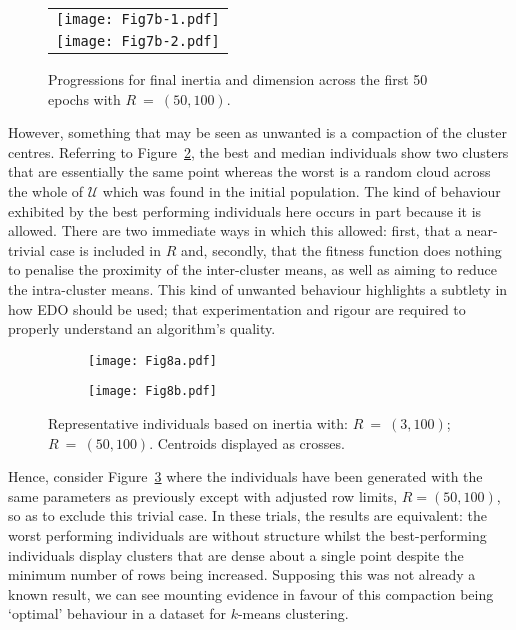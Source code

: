 \begin{figure}[htbp]
    \centering
    \begin{tabular}{c}
        \texttt{[image: Fig7b-1.pdf]}
        \\
        \texttt{[image: Fig7b-2.pdf]}
    \end{tabular}
    \caption{%
        Progressions for final inertia and dimension across the first 50 epochs
        with \(R~=~(50,100)\).
    }\label{fig:large-inertia-50}
\end{figure}

However, something that may be seen as unwanted is a compaction of the cluster
centres. Referring to Figure~\ref{fig:small-inertia-inds}, the best and median
individuals show two clusters that are essentially the same point whereas the
worst is a random cloud across the whole of \(\mathcal{U}\) which was found in
the initial population. The kind of behaviour exhibited by the best performing
individuals here occurs in part because it is allowed. There are two immediate
ways in which this allowed: first, that a near-trivial case is included in \(R\)
and, secondly, that the fitness function does nothing to penalise the proximity
of the inter-cluster means, as well as aiming to reduce the intra-cluster means.
This kind of unwanted behaviour highlights a subtlety in how EDO should be used;
that experimentation and rigour are required to properly understand an
algorithm's quality.

\begin{figure}[htbp]
    \centering
    \begin{subfigure}{\imgwidth}
        \texttt{[image: Fig8a.pdf]}
        \caption{}\label{fig:small-inertia-inds}
    \end{subfigure}

    \begin{subfigure}{\imgwidth}
        \texttt{[image: Fig8b.pdf]}
        \caption{}\label{fig:large-inertia-inds}
    \end{subfigure}
    \caption{%
        Representative individuals based on inertia with:
         \(R~=~(3,100)\);
         \(R~=~(50,100)\). Centroids displayed as
        crosses.
    }\label{fig:inertia-inds}
\end{figure}

Hence, consider Figure~\ref{fig:large-inertia-inds} where the individuals have
been generated with the same parameters as previously except with adjusted row
limits, \(R = (50, 100)\), so as to exclude this trivial case. In these trials,
the results are equivalent: the worst performing individuals are without
structure whilst the best-performing individuals display clusters that are dense
about a single point despite the minimum number of rows being increased.
Supposing this was not already a known result, we can see mounting evidence in
favour of this compaction being `optimal' behaviour in a dataset for \(k\)-means
clustering.

